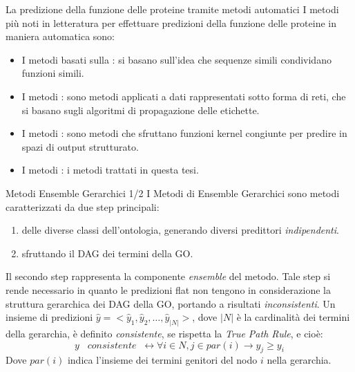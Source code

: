 \documentclass[9pt]{beamer}
\begin{document}
\begin{tframe}{La predizione della funzione delle proteine tramite metodi automatici}
I metodi più noti in letteratura per effettuare predizioni della funzione delle proteine in maniera automatica sono:

\begin{itemize}
\item I metodi basati sulla : si basano sull'idea che sequenze simili condividano funzioni simili.
\item I metodi : sono metodi applicati a dati rappresentati sotto forma di reti, che si basano sugli algoritmi di propagazione delle etichette.
\item I metodi : sono metodi che sfruttano funzioni kernel congiunte per predire in spazi di output strutturato.
\item I metodi : i metodi trattati in questa tesi.
\end{itemize}

\end{tframe}

\begin{tframe}{Metodi Ensemble Gerarchici 1/2}
I Metodi di Ensemble Gerarchici sono metodi caratterizzati da due step principali:

\begin{enumerate}
\item {} delle diverse classi dell’ontologia, generando diversi predittori \emph{indipendenti}.
\item {} sfruttando il DAG dei termini della GO.
\end{enumerate}
Il secondo step rappresenta la componente \emph{ensemble} del metodo. Tale step si rende necessario in quanto le predizioni flat non tengono in considerazione la struttura gerarchica dei DAG della GO, portando a risultati \emph{inconsistenti}.
Un insieme di predizioni $\hat{y} = <\hat{y}_1, \hat{y}_2, \dots, \hat{y}_{|N|}>$, dove $|N|$ è la cardinalità dei termini della gerarchia, è definito \emph{consistente}, se rispetta la \emph{True Path Rule}, e cioè:
\[
y\;\;\;consistente\;\; \leftrightarrow \forall i \in N, j \in par(i) \rightarrow y_j \geq y_i
\] 
Dove $par(i)$ indica l'insieme dei termini genitori del nodo $i$ nella gerarchia.
\endblock{}
\end{tframe}
\end{document}
